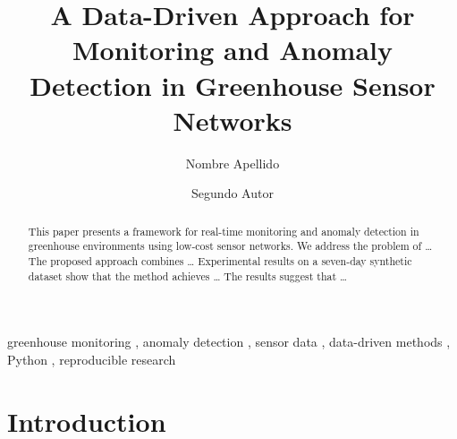 \documentclass[preprint,12pt,authoryear]{elsarticle}
\begin{document}
\begin{frontmatter}

\title{%
  A Data-Driven Approach for Monitoring and Anomaly Detection
  in Greenhouse Sensor Networks
}

\author[inst1]{Nombre Apellido}

\author[inst1,inst2]{Segundo Autor}




\begin{abstract}

This paper presents a framework for real-time monitoring and
anomaly detection in greenhouse environments using low-cost
sensor networks. We address the problem of \ldots
The proposed approach combines \ldots
Experimental results on a seven-day synthetic dataset show
that the method achieves \ldots
The results suggest that \ldots
\end{abstract}

\begin{keyword}
greenhouse monitoring \sep
anomaly detection \sep
sensor data \sep
data-driven methods \sep
Python \sep
reproducible research
\end{keyword}

\end{frontmatter}

\section{Introduction}
\label{sec:introduction}
\end{document}
